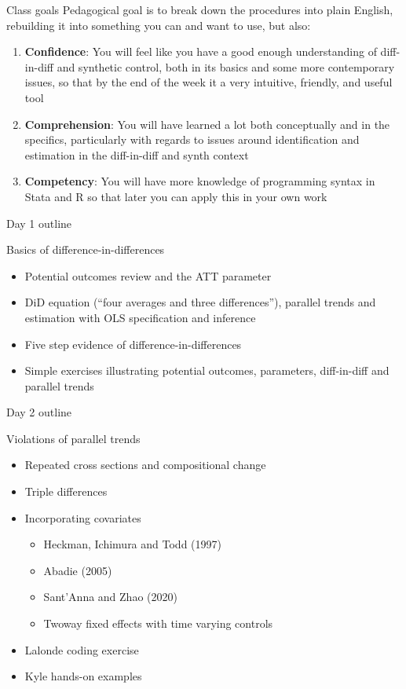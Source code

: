 \documentclass{beamer}
\begin{document}
\begin{frame}{Class goals}
Pedagogical goal is to break down the procedures into plain English, rebuilding it into something you can and want to use, but also:

  \begin{enumerate}
    \item \textbf{Confidence}: You will feel like you have a good enough understanding of diff-in-diff and synthetic control, both in its basics and some more contemporary issues, so that by the end of the week it a very intuitive, friendly, and useful tool
    \item \textbf{Comprehension}: You will have learned a lot both conceptually and in the specifics, particularly with regards to issues around identification and estimation in the diff-in-diff and synth context
    \item \textbf{Competency}: You will have more knowledge of programming syntax in Stata and R so that later you can apply this in your own work
  \end{enumerate}

\end{frame}



\begin{frame}{Day 1 outline}

Basics of difference-in-differences 
	\begin{itemize}
	\item Potential outcomes review and the ATT parameter
	\item DiD equation (``four averages and three differences''), parallel trends and estimation with OLS specification and inference
	\item Five step evidence of difference-in-differences
	\item Simple exercises illustrating potential outcomes, parameters, diff-in-diff and parallel trends
	\end{itemize}

\end{frame}


\begin{frame}{Day 2 outline}

Violations of parallel trends
	\begin{itemize}
	\item Repeated cross sections and compositional change
	\item Triple differences
	\item Incorporating covariates
		\begin{itemize}
		\item Heckman, Ichimura and Todd (1997)
		\item Abadie (2005)
		\item Sant’Anna and Zhao (2020)
		\item Twoway fixed effects with time varying controls	
		\end{itemize}
	\item Lalonde coding exercise
	\item Kyle hands-on examples
	\end{itemize}

\end{frame}
\end{document}
